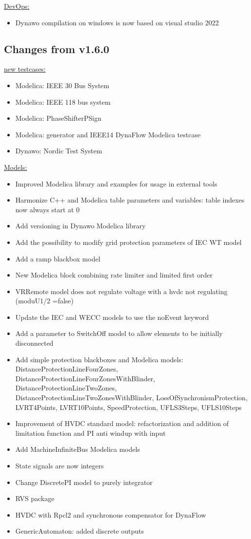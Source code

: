 \documentclass[a4paper, 12pt]{report}
\begin{document}
\underline{DevOps:}
\begin{itemize}
\item Dynawo compilation on windows is now based on visual studio 2022
\end{itemize}


\subsection{Changes from v1.6.0}

\underline{new testcases:}

\begin{itemize}
\item Modelica: IEEE 30 Bus System
\item Modelica: IEEE 118 bus system
\item Modelica: PhaseShifterPSign
\item Modelica: generator and IEEE14 DynaFlow Modelica testcase
\item Dynawo: Nordic Test System
\end{itemize}

\underline{Models:}

\begin{itemize}
\item Improved Modelica library and examples for usage in external tools
\item Harmonize C++ and Modelica table parameters and variables: table indexes now always start at 0
\item Add versioning in Dynawo Modelica library
\item Add the possibility to modify grid protection parameters of IEC WT model
\item Add a ramp blackbox model
\item New Modelica block combining rate limiter and limited first order
\item VRRemote model does not regulate voltage with a hvdc not regulating (moduU1/2 =false)
\item Update the IEC and WECC models to use the noEvent keyword
\item Add a parameter to SwitchOff model to allow elements to be initially disconnected
\item Add simple protection blackboxes and Modelica models: DistanceProtectionLineFourZones, DistanceProtectionLineFourZonesWithBlinder, DistanceProtectionLineTwoZones, DistanceProtectionLineTwoZonesWithBlinder, LossOfSynchronismProtection, LVRT4Points, LVRT10Points, SpeedProtection, UFLS3Steps, UFLS10Steps
\item Improvement of HVDC standard model: refactorization and addition of limitation function and PI anti windup with input
\item Add MachineInfiniteBus Modelica models
\item State signals are now integers
\item Change DiscretePI model to purely integrator
\item RVS package
\item HVDC with Rpcl2 and synchronous compensator for DynaFlow
\item GenericAutomaton: added discrete outputs
\end{itemize}
\end{document}
